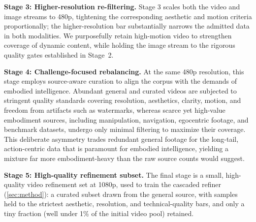 \noindent\textbf{Stage 3: Higher-resolution re-filtering.}
Stage 3 scales both the video and image streams to 480p, tightening the corresponding aesthetic and motion criteria proportionally; the higher-resolution bar substantially narrows the admitted data in both modalities. We purposefully retain high-motion video to strengthen coverage of dynamic content, while holding the image stream to the rigorous quality gates established in Stage~2.

\noindent\textbf{Stage 4: Challenge-focused rebalancing.}
At the same 480p resolution, this stage employs source-aware curation to align the corpus with the demands of embodied intelligence. Abundant general and curated videos are subjected to stringent quality standards covering resolution, aesthetics, clarity, motion, and freedom from artifacts such as watermarks, whereas scarce yet high-value embodiment sources, including manipulation, navigation, egocentric footage, and benchmark datasets, undergo only minimal filtering to maximize their coverage. This deliberate asymmetry trades redundant general footage for the long-tail, action-centric data that is paramount for embodied intelligence, yielding a mixture far more embodiment-heavy than the raw source counts would suggest.

\noindent\textbf{Stage 5: High-quality refinement subset.}
The final stage is a small, high-quality video refinement set at 1080p, used to train the cascaded refiner (\cref{sec:method}): a curated subset drawn from the general source, with samples held to the strictest aesthetic, resolution, and technical-quality bars, and only a tiny fraction (well under 1\% of the initial video pool) retained.

